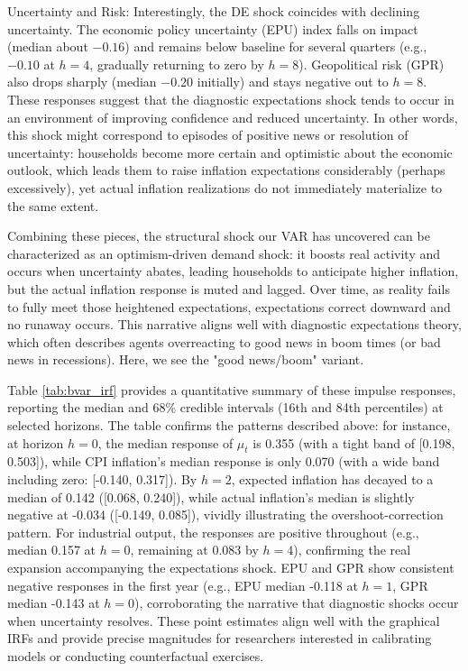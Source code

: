 \documentclass[12pt]{article}
\begin{document}
Uncertainty and Risk: Interestingly, the DE shock coincides with declining uncertainty. The economic policy uncertainty (EPU) index falls on impact (median about $-0.16$) and remains below baseline for several quarters (e.g., $-0.10$ at $h=4$, gradually returning to zero by $h=8$). Geopolitical risk (GPR) also drops sharply (median $-0.20$ initially) and stays negative out to $h=8$. These responses suggest that the diagnostic expectations shock tends to occur in an environment of improving confidence and reduced uncertainty. In other words, this shock might correspond to episodes of positive news or resolution of uncertainty: households become more certain and optimistic about the economic outlook, which leads them to raise inflation expectations considerably (perhaps excessively), yet actual inflation realizations do not immediately materialize to the same extent.

Combining these pieces, the structural shock our VAR has uncovered can be characterized as an optimism-driven demand shock: it boosts real activity and occurs when uncertainty abates, leading households to anticipate higher inflation, but the actual inflation response is muted and lagged. Over time, as reality fails to fully meet those heightened expectations, expectations correct downward and no runaway occurs. This narrative aligns well with diagnostic expectations theory, which often describes agents overreacting to good news in boom times (or bad news in recessions). Here, we see the "good news/boom" variant.

Table \ref{tab:bvar_irf} provides a quantitative summary of these impulse responses, reporting the median and 68\% credible intervals (16th and 84th percentiles) at selected horizons. The table confirms the patterns described above: for instance, at horizon $h=0$, the median response of $\mu_t$ is 0.355 (with a tight band of [0.198, 0.503]), while CPI inflation's median response is only 0.070 (with a wide band including zero: [-0.140, 0.317]). By $h=2$, expected inflation has decayed to a median of 0.142 ([0.068, 0.240]), while actual inflation's median is slightly negative at -0.034 ([-0.149, 0.085]), vividly illustrating the overshoot-correction pattern. For industrial output, the responses are positive throughout (e.g., median 0.157 at $h=0$, remaining at 0.083 by $h=4$), confirming the real expansion accompanying the expectations shock. EPU and GPR show consistent negative responses in the first year (e.g., EPU median -0.118 at $h=1$, GPR median -0.143 at $h=0$), corroborating the narrative that diagnostic shocks occur when uncertainty resolves. These point estimates align well with the graphical IRFs and provide precise magnitudes for researchers interested in calibrating models or conducting counterfactual exercises.
\end{document}
